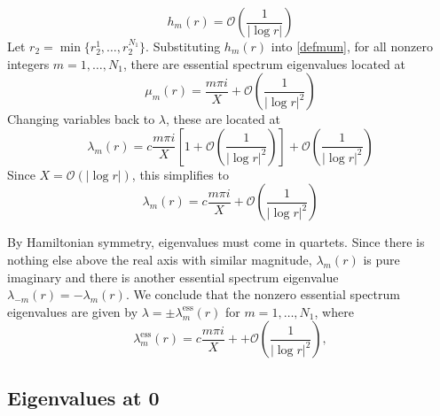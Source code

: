 \documentclass[thesis.tex]{subfiles}
\begin{document}
\[
h_m(r) = \mathcal{O}\left( \frac{1}{|\log r|} \right)
\]
Let $r_2 = \min\{ r_2^1, \dots, r_2^{N_1} \}$. Substituting $h_m(r)$ into \cref{defmum}, for all nonzero integers $m = 1, \dots, N_1$, there are essential spectrum eigenvalues located at
\[
\mu_m(r) = \frac{m \pi i}{X} + \mathcal{O}\left( \frac{1}{|\log r|^2} \right)
\]
Changing variables back to $\lambda$, these are located at
\[
\lambda_m(r) = c \frac{m \pi i}{X}\left[1 + \mathcal{O}\left( \frac{1}{|\log r|^2} \right) \right] +\mathcal{O}\left( \frac{1}{|\log r|^2} \right)
\]
Since $X = \mathcal{O}(|\log r|)$, this simplifies to
\[
\lambda_m(r) = c \frac{m \pi i}{X} +\mathcal{O}\left( \frac{1}{|\log r|^2} \right)
\]

By Hamiltonian symmetry, eigenvalues must come in quartets. Since there is nothing else above the real axis with similar magnitude, $\lambda_m(r)$ is pure imaginary and there is another essential spectrum eigenvalue $\lambda_{-m}(r) = -\lambda_m(r)$. We conclude that the nonzero essential spectrum eigenvalues are given by $\lambda = \pm \lambda_m^{\text{ess}}(r)$ for $m = 1, \dots, N_1$, where
\[
\lambda_m^{\text{ess}}(r) = c \frac{m \pi i}{X} + +\mathcal{O}\left( \frac{1}{|\log r|^2} \right),
\]

\subsection{Eigenvalues at 0}
\end{document}
